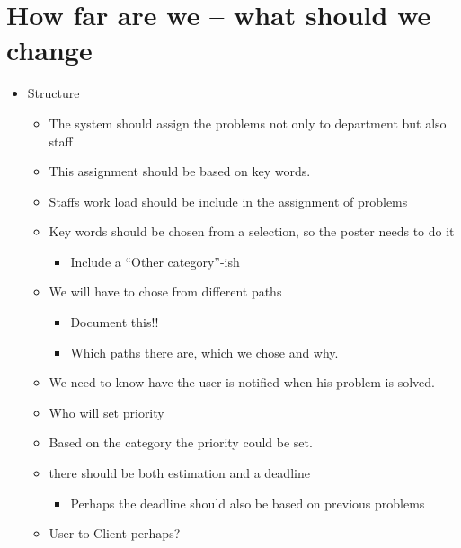 \documentclass{article}
\begin{document}
\section{How far are we -- what should we change}

\begin{itemize}
	\item Structure
	
	\begin{itemize}
		\item The system should assign the problems not only to department but also staff
		\item This assignment should be based on key words.
		\item Staffs work load should be include in the assignment of problems
		\item Key words should be chosen from a selection, so the poster needs to do it
		
		\begin{itemize}
			\item Include a ``Other category''-ish
		\end{itemize}
		
		\item We will have to chose from different paths
		
		\begin{itemize}
			\item Document this!!
			\item Which paths there are, which we chose and why.
		\end{itemize}
		
		\item We need to know have the user is notified when his problem is solved.
		\item Who will set priority
		\item Based on the category the priority could be set.
		\item there should be both estimation and a deadline
		
		\begin{itemize}
			\item Perhaps the deadline should also be based on previous problems
		\end{itemize}
		
		\item User to Client perhaps?
	\end{itemize}
	
\end{itemize}
\end{document}
